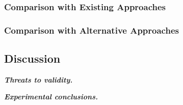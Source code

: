 \subsubsection{Comparison with Existing Approaches}
\label{sec:existing}


\subsubsection{Comparison with Alternative Approaches}
\label{sec:alternative}


\subsection{Discussion}

\noindent \textbf{\textit{Threats to validity.}}

\vspace{1mm}

\noindent \textbf{\textit{Experimental conclusions.}}
